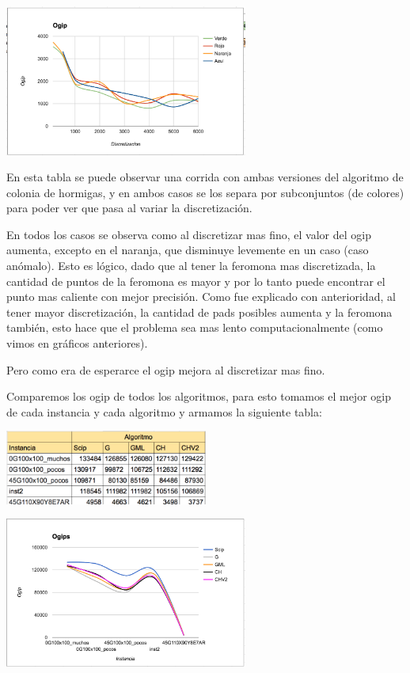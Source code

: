 \begin{center}
\includegraphics[width=0.6\textwidth]{imagenes/grafico21}
\end{center}

En esta tabla se puede observar una corrida con ambas versiones del algoritmo de colonia de hormigas, y en ambos casos se los separa por subconjuntos (de colores) para poder ver que pasa al variar la discretizaci\'on.

En todos los casos se observa como al discretizar mas fino, el valor del ogip aumenta, excepto en el naranja, que disminuye levemente en un caso (caso an\'omalo). Esto es l\'ogico, dado que al tener la feromona mas discretizada, la cantidad de puntos de la feromona es mayor y por lo tanto puede encontrar el punto mas caliente con mejor precisi\'on. Como fue explicado con anterioridad, al tener mayor discretizaci\'on, la cantidad de pads posibles aumenta y la feromona tambi\'en, esto hace que el problema sea mas lento computacionalmente (como vimos en gr\'aficos anteriores). 

Pero como era de esperarce el ogip mejora al discretizar mas fino.

\newpage

Comparemos los ogip de todos los algoritmos, para esto tomamos el mejor ogip de cada instancia y cada algoritmo y armamos la siguiente tabla:

\begin{center}
\includegraphics[width=0.5\textwidth]{imagenes/tabla22}
\end{center}

\begin{center}
\includegraphics[width=0.6\textwidth]{imagenes/grafico22}
\end{center}

